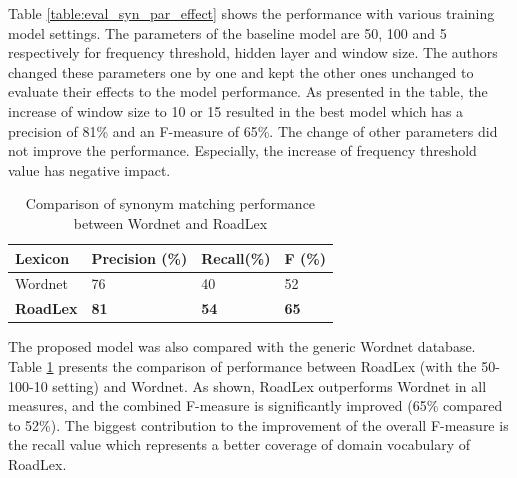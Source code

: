\documentclass[Journal,InsideFigs, DoubleSpace]{ascelike} %
\begin{document}
%
Table \ref{table:eval_syn_par_effect} shows the performance with various training model settings. The parameters of the baseline model are 50, 100 and 5 respectively for frequency threshold, hidden layer and window size. The authors changed these parameters one by one and kept the other ones unchanged to evaluate their effects to the model performance. As presented in the table, the increase of window size to 10 or 15 resulted in the best model which has a precision of 81\% and an F-measure of 65\%. The change of other parameters did not improve the performance. Especially, the increase of frequency threshold value has negative impact. 
%
\begin{table} [b] 
	\caption{Comparison of synonym matching performance between Wordnet and RoadLex}
	\label{table:eval_syn_vs_Wordnet}
	\centering
	\small
	\renewcommand{\arraystretch}{1.25}
	\begin{tabular}{l l l l }
		\hline
		\hline
		\textbf{Lexicon} & \textbf{Precision (\%)}  & \textbf{Recall(\%)} & \textbf{F (\%)}\\
		\hline
		Wordnet	&76 	&40 	&52\\	
		\textbf{RoadLex} &\textbf{81}	&\textbf{54}		&\textbf{65}\\	
		\hline
		\hline
	\end{tabular}
	\normalsize
\end{table}
\par
The proposed model was also compared with the generic Wordnet database. Table \ref{table:eval_syn_vs_Wordnet} presents the comparison of performance between RoadLex (with the 50-100-10 setting) and Wordnet. As shown, RoadLex outperforms Wordnet in all measures, and the combined F-measure is significantly improved (65\% compared to 52\%). The biggest contribution to the improvement of the overall F-measure is the recall value which represents a better coverage of domain vocabulary of RoadLex. 
\end{document}

